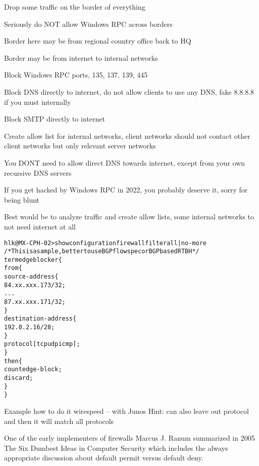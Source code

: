 \documentclass[Screen16to9,17pt]{foils}
\begin{document}
\begin{list2}
\item Drop some traffic on the border of everything
\item Seriously do NOT allow Windows RPC across borders
\item Border here may be from regional country office back to HQ
\item Border may be from internet to internal networks
\item Block Windows RPC ports, 135, 137, 139, 445
\item Block DNS directly to internet, do not allow clients to use any DNS, fake 8.8.8.8 if you must internally
\item Block SMTP directly to internet
\item Create allow list for internal networks, client networks should not contact other client networks but only relevant server networks
\end{list2}

You DONT need to allow direct DNS towards internet, except from your own recursive DNS servers

If you get hacked by Windows RPC in 2022, you probably deserve it, sorry for being blunt

Best would be to analyze traffic and create allow lists, some internal networks to not need internet at all




\begin{alltt}\footnotesize
hlk@MX-CPH-02> show configuration firewall filter all | no-more
/* This is a sample, better to use BGP flowspec or BGP based RTBH */
term edgeblocker \{
    from \{
        source-address \{
            84.xx.xxx.173/32;
...
            87.xx.xxx.171/32;
        \}
        destination-address \{
            192.0.2.16/28;
        \}
        protocol [ tcp udp icmp ];
    \}
    then \{
        count edge-block;
        discard;
    \}
\}
\end{alltt}{\footnotesize
Example how to do it wirespeed -- with Junos
Hint: can also leave out protocol and then it will match all protocols}




One of the early implementers of firewalls Marcus J. Ranum summarized in 2005 The Six Dumbest Ideas in Computer Security  which includes the always appropriate discussion about default permit versus default deny.
\end{document}
